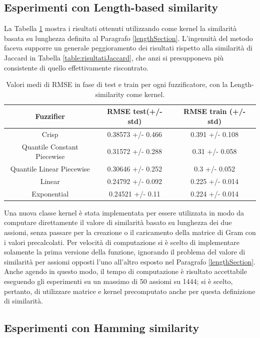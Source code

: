 \documentclass[12pt,a4paper]{report}
\begin{document}
\subsection{Esperimenti con Length-based similarity}

La Tabella \ref{table:risultatiLength} mostra i risultati ottenuti utilizzando come kernel la similarità basata su lunghezza definita al Paragrafo \ref{lengthSection}. L'ingenuità del metodo faceva supporre un generale peggioramento dei risultati rispetto alla similarità di Jaccard in Tabella \ref{table:risultatiJaccard}, che anzi si presupponeva più consistente di quello effettivamente riscontrato.

\begin{table}[h!]
\small
\centering 	
	\begin{tabular}{|c|c|c|} 
	 \hline
	 Fuzzifier & RMSE test(+/- std) & RMSE train (+/- std)\\ [0.5ex] 
	 \hline
	 Crisp & 0.38573 +/- 0.466 & 0.391 +/- 0.108 \\ 
	 \hline
	 Quantile Constant Piecewise & 0.31572 +/- 0.288 & 0.31 +/- 0.058\\
	 \hline
	 Quantile Linear Piecewise & 0.30646 +/- 0.252 & 0.3 +/- 0.052\\
	 \hline
	 Linear & 0.24792 +/- 0.092 & 0.225 +/- 0.014\\
	 \hline
	 Exponential & 0.24521 +/- 0.11 & 0.224 +/- 0.014\\ [1ex] 
	 \hline
	\end{tabular}
	\caption{Valori medi di RMSE in fase di test e train per ogni fuzzificatore, con la Length-similarity come kernel.}	
	\label{table:risultatiLength}
\end{table}

Una nuova classe kernel è stata implementata per essere utilizzata in modo da computare direttamente il valore di similarità basato su lunghezza dei due assiomi, senza passare per la creazione o il caricamento della matrice di Gram con i valori precalcolati.
Per velocità di computazione si è scelto di implementare solamente la prima versione della funzione, ignorando il problema del valore di similarità per assiomi opposti l'uno all'altro esposto nel Paragrafo \ref{lengthSection}.
Anche agendo in questo modo, il tempo di computazione è risultato accettabile eseguendo gli esperimenti su un massimo di 50 assiomi su 1444; si è scelto, pertanto, di utilizzare matrice e kernel precomputato anche per questa definizione di similarità. 

\subsection{Esperimenti con Hamming similarity}
\end{document}
